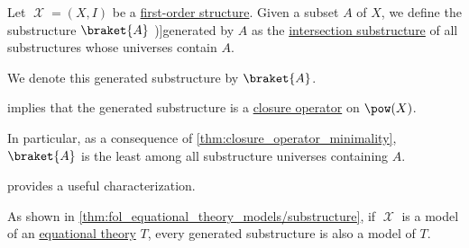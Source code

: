 \begin{definition}\label{def:fol_generated_substructure}
  Let \( \mscrX = (X, I) \) be a \hyperref[def:fol_structure]{first-order structure}. Given a subset \( A \) of \( X \), we define the substructure \( \braket{ A } \) \term[ru=порожденная (\cite[55]{Мальцев1970АлгебраическиеСистемы})]{generated} by \( A \) as the \hyperref[def:fol_intersection_substructure]{intersection substructure} of all substructures whose universes contain \( A \).

  We denote this generated substructure by \( \braket{ A } \).
\end{definition}
\begin{comments}
  \item {} implies that the generated substructure is a \hyperref[def:abstract_closure_operator]{closure operator} on \( \pow(X) \).

  In particular, as a consequence of \cref{thm:closure_operator_minimality}, \( \braket{ A } \) is the least among all substructure universes containing \( A \).

  \item {} provides a useful characterization.

  \item As shown in \cref{thm:fol_equational_theory_models/substructure}, if \( \mscrX \) is a model of an \hyperref[def:fol_equational_theory]{equational theory} \( T \), every generated substructure is also a model of \( T \).
\end{comments}


